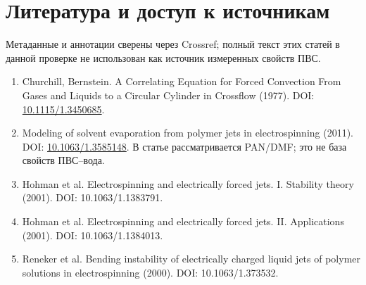 \documentclass[12pt,a4paper]{article}
\begin{document}
\section{Литература и доступ к источникам}
Метаданные и аннотации сверены через Crossref; полный текст этих статей
в данной проверке не использован как источник измеренных свойств ПВС.
\begin{enumerate}
\item Churchill, Bernstein. A Correlating Equation for Forced Convection From
Gases and Liquids to a Circular Cylinder in Crossflow (1977).
DOI: \href{https://doi.org/10.1115/1.3450685}{10.1115/1.3450685}.
\item Modeling of solvent evaporation from polymer jets in electrospinning (2011).
DOI: \href{https://doi.org/10.1063/1.3585148}{10.1063/1.3585148}.
В статье рассматривается PAN/DMF; это не база свойств ПВС--вода.
\item Hohman et al. Electrospinning and electrically forced jets. I. Stability
 theory (2001). DOI: 10.1063/1.1383791.
\item Hohman et al. Electrospinning and electrically forced jets. II. Applications
 (2001). DOI: 10.1063/1.1384013.
\item Reneker et al. Bending instability of electrically charged liquid jets of
 polymer solutions in electrospinning (2000). DOI: 10.1063/1.373532.
\end{enumerate}
\end{document}
